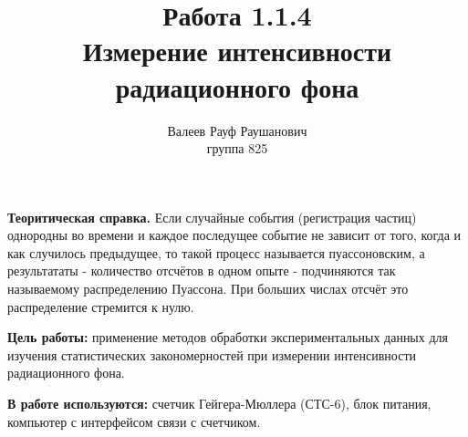 \documentclass[a4paper, 10pt]{article}%
\author{Валеев Рауф Раушанович \\
группа 825}
\title{Работа 1.1.4 \\
Измерение интенсивности радиационного фона}
\begin{document}
\maketitle
\newpage
\textbf{Теоритическая справка.} Если случайные события (регистрация частиц) однородны во времени и каждое последущее событие не зависит от того, когда и как случилось предыдущее, то такой процесс называется пуассоновским, а результататы - количество отсчётов в одном опыте - подчиняются так называемому распределению Пуассона. При больших числах отсчёт это распределение стремится к нулю. 

\textbf{Цель работы:} применение методов обработки экспериментальных данных для изучения статистических закономерностей при измерении интенсивности радиационного фона.

\textbf{В работе используются:} счетчик Гейгера-Мюллера (СТС-6), блок питания, компьютер с интерфейсом связи с счетчиком.
\end{document}
